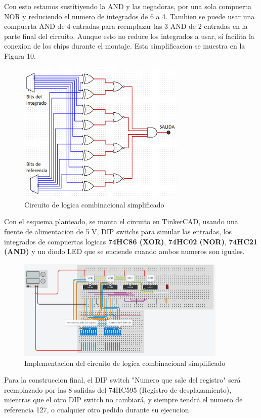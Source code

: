 \documentclass{article}
\begin{document}
Con esto estamos sustitiyendo la AND y las negadoras, por una sola compuerta NOR y reduciendo el numero de integrados de 6 a 4. Tambien se puede usar una compuerta AND de 4 entradas para reemplazar las 3 AND de 2 entradas en la parte final del circuito. Aunque esto no reduce los integrados a usar, sí facilita la conexion de los chips durante el montaje. Esta simplificacion se muestra en la Figura 10.

\begin{figure}[!hb] 
\includegraphics[width=8cm]{logica2.png}
\centering
\caption{Circuito de logica combinacional simplificado}
\end{figure}

Con el esquema planteado, se monta el circuito en TinkerCAD, usando una fuente de alimentacion de 5 V, DIP switchs para simular las entradas, los integrados de compuertas logicas \textbf{74HC86 (XOR)}, \textbf{74HC02 (NOR)}, \textbf{74HC21 (AND)} y un diodo LED que se enciende cuando ambos numeros son iguales.\\

\begin{figure}[!ht] 
\includegraphics[width=10cm]{montajeCompuertas.PNG}
\centering
\caption{Implementacion del circuito de logica combinacional simplificado}
\end{figure}

Para la construccion final, el DIP switch "Numero que sale del registro" será reemplazado por las 8 salidas del 74HC595 (Registro de desplazamiento), mientras que el otro DIP switch no cambiará, y siempre tendrá el numero de referencia 127, o cualquier otro pedido durante su ejecucion.
\end{document}
